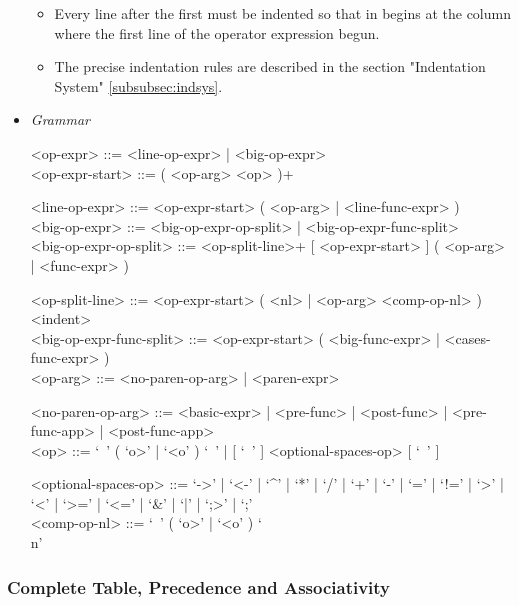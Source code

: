 \documentclass{article}
\begin{document}
\begin{itemize}
\begin{itemize}
\item
Every line after the first must be indented so that in begins at the column 
where the first line of the operator expression begun.

\item
The precise indentation rules are described in the section
"Indentation System" \ref{subsubsec:indsys}.
\end{itemize}

\item \textit{Grammar}
\begin{grammar}
<op-expr> ::= <line-op-expr> | <big-op-expr>
\\

<op-expr-start> ::= ( <op-arg> <op> )+

<line-op-expr> ::= <op-expr-start> ( <op-arg> | <line-func-expr> )
\\

<big-op-expr> ::= 
<big-op-expr-op-split> | <big-op-expr-func-split>
\\

<big-op-expr-op-split> ::= 
<op-split-line>+ [ <op-expr-start> ] ( <op-arg> | <func-expr> )

<op-split-line> ::=
<op-expr-start> ( <nl> | <op-arg> <comp-op-nl> ) <indent> 
\\

<big-op-expr-func-split> ::= <op-expr-start> ( <big-func-expr> | <cases-func-expr> )
\\

<op-arg> ::= <no-paren-op-arg> | <paren-expr>

<no-paren-op-arg> ::=
<basic-expr> | <pre-func> | <post-func> | <pre-func-app> | <post-func-app>
\\

<op> ::=  
`\ ' ( `o>' | `<o' ) `\ ' | [ `\ ' ] <optional-spaces-op> [ `\ ' ]

<optional-spaces-op> ::= 
`->' | `<-' | `^' | `*' | `/' | `+' | `-' | `=' | `!=' | `>' | `<' | `>=' | `<=' |
`\&' | `|' | `;>' | `;'
\\

<comp-op-nl> ::= `\ ' ( `o>' | `<o' ) `\\n'
\end{grammar}
\end{itemize}

\newpage
\subsubsection{Complete Table, Precedence and Associativity}
\end{document}
